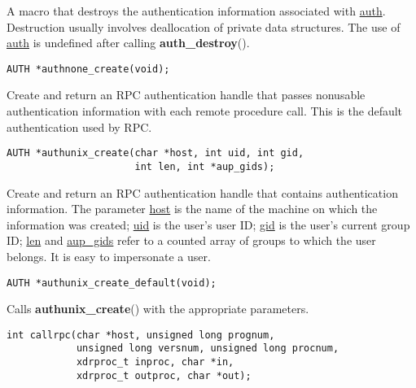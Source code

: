 \documentclass[]{article}
\let\realtextbf=\textbf
\renewcommand{\textbf}[1]{\textcolor{boldcolor}{\realtextbf{#1}}}
\renewcommand{\emph}[1]{\underline{#1}}
\begin{document}
\begin{description}
\itemsep1pt\parskip0pt
\item[]
A macro that destroys the authentication information associated with
\emph{auth}. Destruction usually involves deallocation of private data
structures. The use of \emph{auth} is undefined after calling
\textbf{auth\_destroy}().
\end{description}

\begin{verbatim}
AUTH *authnone_create(void);
\end{verbatim}

\begin{description}
\itemsep1pt\parskip0pt
\item[]
Create and return an RPC authentication handle that passes nonusable
authentication information with each remote procedure call. This is the
default authentication used by RPC.
\end{description}

\begin{verbatim}
AUTH *authunix_create(char *host, int uid, int gid,
                      int len, int *aup_gids);
\end{verbatim}

\begin{description}
\itemsep1pt\parskip0pt
\item[]
Create and return an RPC authentication handle that contains
authentication information. The parameter \emph{host} is the name of the
machine on which the information was created; \emph{uid} is the user's
user ID; \emph{gid} is the user's current group ID; \emph{len} and
\emph{aup\_gids} refer to a counted array of groups to which the user
belongs. It is easy to impersonate a user.
\end{description}

\begin{verbatim}
AUTH *authunix_create_default(void);
\end{verbatim}

\begin{description}
\itemsep1pt\parskip0pt
\item[]
Calls \textbf{authunix\_create}() with the appropriate parameters.
\end{description}

\begin{verbatim}
int callrpc(char *host, unsigned long prognum,
            unsigned long versnum, unsigned long procnum,
            xdrproc_t inproc, char *in,
            xdrproc_t outproc, char *out);
\end{verbatim}
\end{document}
